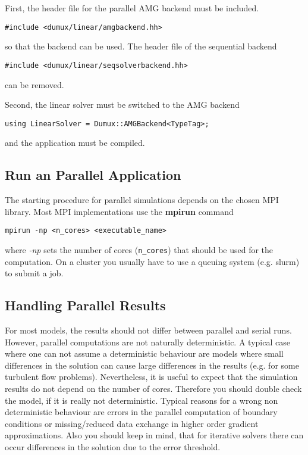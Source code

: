 First, the header file for the parallel AMG backend must be included.

\begin{lstlisting}[style=DumuxCode]
#include <dumux/linear/amgbackend.hh>
\end{lstlisting}

so that the backend can be used. The header file of the sequential backend

\begin{lstlisting}[style=DumuxCode]
#include <dumux/linear/seqsolverbackend.hh>
\end{lstlisting}
can be removed.

Second, the linear solver must be switched to the AMG backend 

\begin{lstlisting}[style=DumuxCode]
using LinearSolver = Dumux::AMGBackend<TypeTag>;
\end{lstlisting}

and the application must be compiled. 

\subsection{Run an Parallel Application}
The starting procedure for parallel simulations depends on the chosen MPI library. 
Most MPI implementations use the \textbf{mpirun} command

\begin{lstlisting}[style=Bash]
mpirun -np <n_cores> <executable_name>
\end{lstlisting}

where \textit{-np} sets the number of cores (\texttt{n\_cores}) that should be used for the 
computation. On a cluster you usually have to use a queuing system (e.g. slurm) to 
submit a job. 

\subsection{Handling Parallel Results}
For most models, the results should not differ between parallel and serial 
runs. However, parallel computations are not naturally deterministic. 
A typical case where one can not assume a deterministic behaviour are models where
small differences in the solution can cause large differences in the results 
(e.g. for some turbulent flow problems). Nevertheless, it is useful to expect that
the simulation results do not depend on the number of cores. Therefore you should double check 
the model, if it is really not deterministic. Typical reasons for a wrong non deterministic
behaviour are errors in the parallel computation of boundary conditions or missing/reduced
data exchange in higher order gradient approximations. Also you should keep in mind, that 
for iterative solvers there can occur differences in the solution due to the error threshold.


